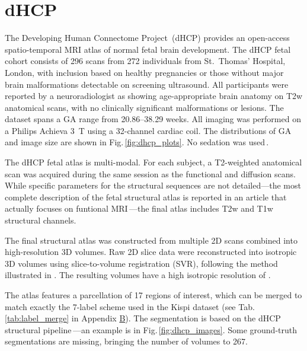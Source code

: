 \section{dHCP}
The Developing Human Connectome Project\,\cite{dHCP} (dHCP) provides an open-access spatio-temporal MRI atlas of normal fetal brain development. The dHCP fetal cohort consists of \num{296} scans from \num{272} individuals from St.\ Thomas' Hospital, London, with inclusion based on healthy pregnancies or those without major brain malformations detectable on screening ultrasound. All participants were reported by a neuroradiologist as showing age-appropriate brain anatomy on T2w anatomical scans, with no clinically significant malformations or lesions. The dataset spans a GA range from \numrange{20.86}{38.29} weeks. All imaging was performed on a Philips Achieva \qty{3}{\tesla} using a 32-channel cardiac coil. The distributions of GA and image size are shown in Fig.\,\ref{fig:dhcp_plots}. No sedation was used\,\cite{Karolis2025}.

The dHCP fetal atlas is multi-modal. For each subject, a T2-weighted anatomical scan was acquired during the same session as the functional and diffusion scans. While specific parameters for the structural sequences are not detailed---the most complete description of the fetal structural atlas is reported in an article that actually focuses on funtional MRI\,\cite{Karolis2025}---the final atlas includes T2w and T1w structural channels.

The final structural atlas was constructed from multiple 2D scans combined into high-resolution 3D volumes. Raw 2D slice data were reconstructed into isotropic 3D volumes using slice-to-volume registration (SVR), following the method illustrated in \cite{CorderoGrande2018}. The resulting volumes have a high isotropic resolution of .

The atlas features a parcellation of \num{17} regions of interest, which can be merged to match exactly the 7-label scheme used in the Kispi dataset (see Tab.\,\ref{tab:label_merge} in Appendix \hyperref[app:SupplementaryTables]{B}). The segmentation is based on the dHCP structural pipeline\,\cite{Makropoulos2018, dHCP_pipeline}---an example is in Fig.\,\ref{fig:dhcp_images}. Some ground-truth segmentations are missing, bringing the number of volumes to \num{267}.

